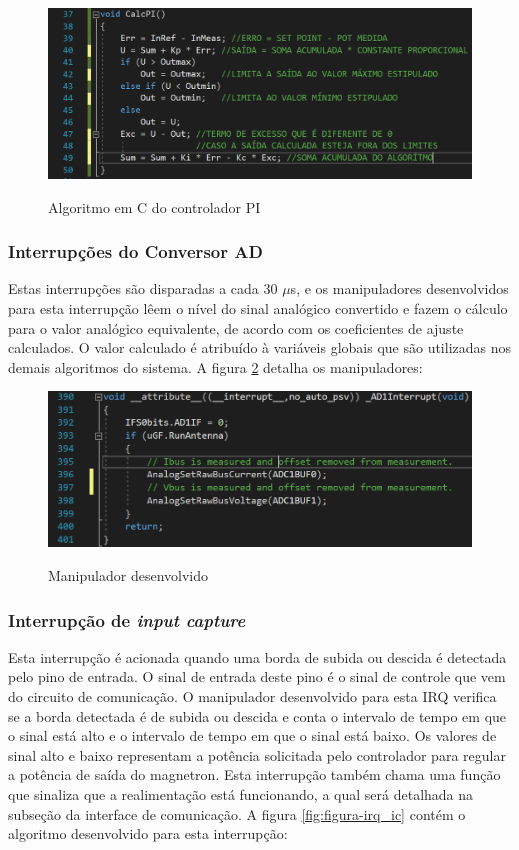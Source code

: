\begin{figure}[H]
    \centering
    \caption{Algoritmo em C do controlador PI}
    \includegraphics[width=1\textwidth]{./dados/figuras/func_pi}
    \label{fig:figura-func-pi}
\end{figure}

\subsubsection{Interrupções do Conversor AD}
Estas interrupções são disparadas a cada 30 $\mu$s, e os manipuladores desenvolvidos para esta interrupção lêem o nível do sinal analógico convertido e fazem o cálculo para o valor analógico equivalente, de acordo com os coeficientes de ajuste calculados. O valor calculado é atribuído à variáveis globais que são utilizadas nos demais algoritmos do sistema. A figura \ref{fig:figura-irq_ad} detalha os manipuladores:

\begin{figure}[H]
    \centering
    \caption{Manipulador desenvolvido}
    \includegraphics[width=1\textwidth]{./dados/figuras/irq_ad}
    \label{fig:figura-irq_ad}
\end{figure}


\subsubsection{Interrupção de \textit{input capture}}
Esta interrupção é acionada quando uma borda de subida ou descida é detectada pelo pino de entrada. O sinal de entrada deste pino é o sinal de controle que vem do circuito de comunicação. O manipulador desenvolvido para esta IRQ verifica se a borda detectada é de subida ou descida e conta o intervalo de tempo em que o sinal está alto e o intervalo de tempo em que o sinal está baixo. Os valores de sinal alto e baixo representam a potência solicitada pelo controlador para regular a potência de saída do magnetron. Esta interrupção também chama uma função que sinaliza que a realimentação está funcionando, a qual será detalhada na subseção da interface de comunicação. A figura \ref{fig:figura-irq_ic} contém o algoritmo desenvolvido para esta interrupção:

